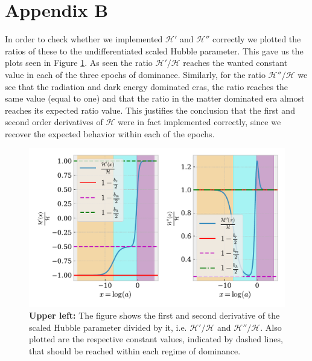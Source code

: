 \documentclass[twocolumn]{aastex62}
\begin{document}
\section{Appendix B} \label{apx:B}
In order to check whether we implemented $\mathcal{H}'$ and $\mathcal{H}''$ correctly we 
plotted the ratios of these to the undifferentiated scaled Hubble parameter. This gave us 
the plots seen in Figure \ref{fig:derivatives}. As seen the ratio $\mathcal{H}' / \mathcal{H}$
reaches the wanted constant value in each of the three epochs of dominance. Similarly,
for the ratio $\mathcal{H}''/ \mathcal{H}$ we see that the radiation and dark energy dominated
eras, the ratio reaches the same value (equal to one) and that the ratio in the matter dominated
era almost reaches its expected ratio value. This justifies the conclusion that the first and second
order derivatives of $\mathcal{H}$ were in fact implemented correctly, since we recover the 
expected behavior within each of the epochs.

\begin{figure}
    \includegraphics[scale=1]{Figures/derivatives.pdf}
    \caption{\textbf{Upper left:} The figure shows the first and second derivative
    of the scaled Hubble parameter divided by it, i.e. $\mathcal{H}'/\mathcal{H}$ and $\mathcal{H}'' / \mathcal{H}$.
    Also plotted are the respective constant values, indicated by dashed lines, 
    that should be reached within each regime of dominance.}
    \label{fig:derivatives}
\end{figure}
\end{document}
